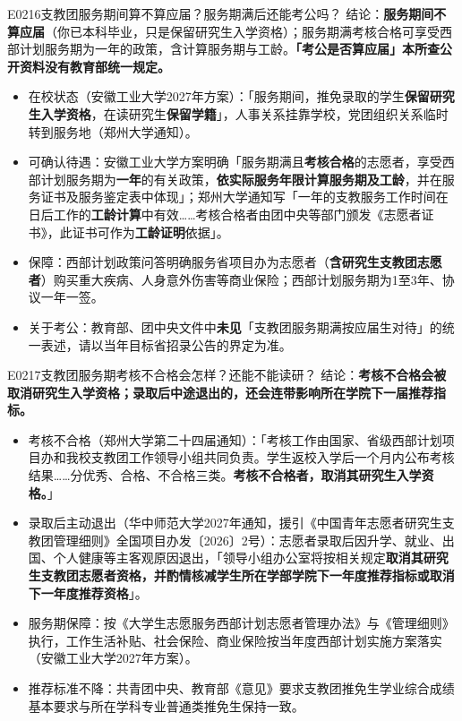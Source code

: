 \begin{qa}{E0216}{支教团服务期间算不算应届？服务期满后还能考公吗？}
结论：\textbf{服务期间不算应届}（你已本科毕业，只是保留研究生入学资格）；服务期满考核合格可享受西部计划服务期为一年的政策，含计算服务期与工龄。\textbf{「考公是否算应届」本所查公开资料没有教育部统一规定。}
\begin{itemize}
  \item 在校状态（安徽工业大学2027年方案）：「服务期间，推免录取的学生\textbf{保留研究生入学资格}，在读研究生\textbf{保留学籍}」，人事关系挂靠学校，党团组织关系临时转到服务地（郑州大学通知）。
  \item 可确认待遇：安徽工业大学方案明确「服务期满且\textbf{考核合格}的志愿者，享受西部计划服务期为\textbf{一年}的有关政策，\textbf{依实际服务年限计算服务期及工龄}，并在服务证书及服务鉴定表中体现」；郑州大学通知写「一年的支教服务工作时间在日后工作的\textbf{工龄计算}中有效……考核合格者由团中央等部门颁发《志愿者证书》，此证书可作为\textbf{工龄证明}依据」。
  \item 保障：西部计划政策问答明确服务省项目办为志愿者（\textbf{含研究生支教团志愿者}）购买重大疾病、人身意外伤害等商业保险；西部计划服务期为1至3年、协议一年一签。
  \item 关于考公：教育部、团中央文件中\textbf{未见}「支教团服务期满按应届生对待」的统一表述，请以当年目标省招录公告的界定为准。
\end{itemize}
\end{qa}

\begin{qa}{E0217}{支教团服务期考核不合格会怎样？还能不能读研？}
结论：\textbf{考核不合格会被取消研究生入学资格；录取后中途退出的，还会连带影响所在学院下一届推荐指标。}
\begin{itemize}
  \item 考核不合格（郑州大学第二十四届通知）：「考核工作由国家、省级西部计划项目办和我校支教团工作领导小组共同负责。学生返校入学后一个月内公布考核结果……分优秀、合格、不合格三类。\textbf{考核不合格者，取消其研究生入学资格。}」
  \item 录取后主动退出（华中师范大学2027年通知，援引《中国青年志愿者研究生支教团管理细则》全国项目办发〔2026〕2号）：志愿者录取后因升学、就业、出国、个人健康等主客观原因退出，「领导小组办公室将按相关规定\textbf{取消其研究生支教团志愿者资格，并酌情核减学生所在学部学院下一年度推荐指标或取消下一年度推荐资格}」。
  \item 服务期保障：按《大学生志愿服务西部计划志愿者管理办法》与《管理细则》执行，工作生活补贴、社会保险、商业保险按当年度西部计划实施方案落实（安徽工业大学2027年方案）。
  \item 推荐标准不降：共青团中央、教育部《意见》要求支教团推免生学业综合成绩基本要求与所在学科专业普通类推免生保持一致。
\end{itemize}
\end{qa}

